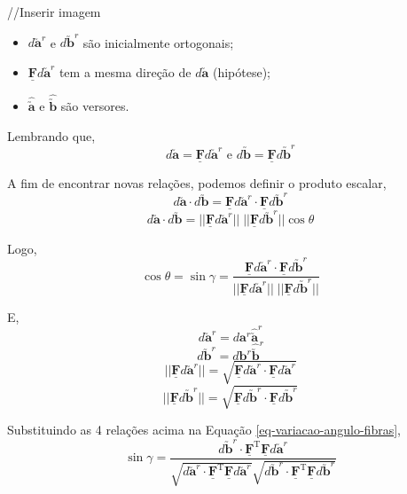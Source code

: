 //Inserir imagem

\begin{itemize}
    \item $d\utilde{\mathbf{a}}^r$ e $d\utilde{\mathbf{b}}^r$ são inicialmente ortogonais;
    \item $\underline{\mathbf{F}}d\utilde{\mathbf{a}}^r$ tem a mesma direção de $d\utilde{\mathbf{a}}$ (hipótese);
    \item $\hat{\utilde{\mathbf{a}}}$ e $\hat{\utilde{\mathbf{b}}}$ são versores.
\end{itemize}

Lembrando que,
\[d\utilde{\mathbf{a}}=\underline{\mathbf{F}}d\utilde{\mathbf{a}}^r\text{ e }d\utilde{\mathbf{b}}=\underline{\mathbf{F}}d\utilde{\mathbf{b}}^r\]

A fim de encontrar novas relações, podemos definir o produto escalar,
\[d\utilde{\mathbf{a}}\cdot d\utilde{\mathbf{b}}=\underline{\mathbf{F}}d\utilde{\mathbf{a}}^r\cdot\underline{\mathbf{F}}d\utilde{\mathbf{b}}^r\]
\[d\utilde{\mathbf{a}}\cdot d\utilde{\mathbf{b}}=||\underline{\mathbf{F}}d\utilde{\mathbf{a}}^r||\;|| \underline{\mathbf{F}}d\utilde{\mathbf{b}}^r ||\cos\theta\]

Logo,
\begin{equation}\label{eq-variacao-angulo-fibras}
    \cos\theta=\sin\gamma=\frac{\underline{\mathbf{F}}d\utilde{\mathbf{a}}^r\cdot\underline{\mathbf{F}}d\utilde{\mathbf{b}}^r}{||\underline{\mathbf{F}}d\utilde{\mathbf{a}}^r||\;|| \underline{\mathbf{F}}d\utilde{\mathbf{b}}^r ||}
\end{equation}

E,
\[d\utilde{\mathbf{a}}^r=d\mathbf{a}^r\hat{\utilde{\mathbf{a}}}^r\]
\[d\utilde{\mathbf{b}}^r=d\mathbf{b}^r\hat{\utilde{\mathbf{b}}}^r\]
\[||\underline{\mathbf{F}}d\utilde{\mathbf{a}}^r||=\sqrt{\underline{\mathbf{F}}d\utilde{\mathbf{a}}^r\cdot\underline{\mathbf{F}}d\utilde{\mathbf{a}}^r}\]
\[||\underline{\mathbf{F}}d\utilde{\mathbf{b}}^r||=\sqrt{\underline{\mathbf{F}}d\utilde{\mathbf{b}}^r\cdot\underline{\mathbf{F}}d\utilde{\mathbf{b}}^r}\]

Substituindo as 4 relações acima na Equação \eqref{eq-variacao-angulo-fibras},
\[\sin\gamma=\frac{d\utilde{\mathbf{b}}^r\cdot\underline{\mathbf{F}}^{\text{T}}\underline{\mathbf{F}}d\utilde{\mathbf{a}}^r}{\sqrt{d\utilde{\mathbf{a}}^r\cdot\underline{\mathbf{F}}^{\text{T}}\underline{\mathbf{F}}d\utilde{\mathbf{a}}^r}\sqrt{d\utilde{\mathbf{b}}^r\cdot\underline{\mathbf{F}}^{\text{T}}\underline{\mathbf{F}}d\utilde{\mathbf{b}}^r}}\]

